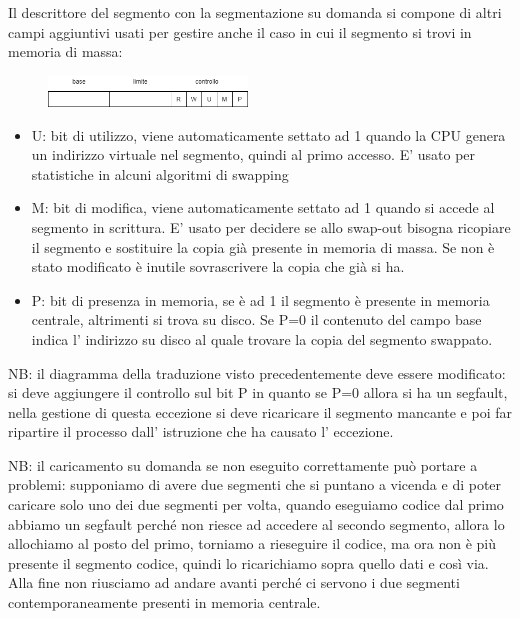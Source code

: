Il descrittore del segmento con la segmentazione su domanda si compone di altri campi aggiuntivi usati per gestire anche il caso in cui il segmento si trovi in memoria di massa:
\begin{figure}[H]
    \centering
    \includegraphics[width=200px]{images/9_Gestione_della_memoria/segment_record_2.png}
\end{figure}
\begin{itemize}
    \item U: bit di utilizzo, viene automaticamente settato ad 1 quando la CPU genera un indirizzo virtuale nel segmento, quindi al primo accesso.
    E' usato per statistiche in alcuni algoritmi di swapping

    \item M: bit di modifica, viene automaticamente settato ad 1 quando si accede al segmento in scrittura.
    E' usato per decidere se allo swap-out bisogna ricopiare il segmento e sostituire la copia già presente in memoria di massa. Se non è stato modificato è inutile sovrascrivere la copia che già si ha.

    \item P: bit di presenza in memoria, se è ad 1 il segmento è presente in memoria centrale, altrimenti si trova su disco.
    Se P=0 il contenuto del campo base indica l' indirizzo su disco al quale trovare la copia del segmento swappato.
\end{itemize}

NB: il diagramma della traduzione visto precedentemente deve essere modificato: si deve aggiungere il controllo sul bit P in quanto se P=0 allora si ha un segfault, nella gestione di questa eccezione si deve ricaricare il segmento mancante e poi far ripartire il processo dall' istruzione che ha causato l' eccezione.

NB: il caricamento su domanda se non eseguito correttamente può portare a problemi: supponiamo di avere due segmenti che si puntano a vicenda e di poter caricare solo uno dei due segmenti per volta, quando eseguiamo codice dal primo abbiamo un segfault perché non riesce ad accedere al secondo segmento, allora lo allochiamo al posto del primo, torniamo a rieseguire il codice, ma ora non è più presente il segmento codice, quindi lo ricarichiamo sopra quello dati e così via.
Alla fine non riusciamo ad andare avanti perché ci servono i due segmenti contemporaneamente presenti in memoria centrale.


